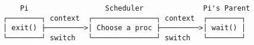 \documentclass[varwidth=50em,crop]{standalone}
\begin{document}
\begin{verbatim}
    Pi                  Scheduler              Pi's Parent
┌────────┐ context  ┌───────────────┐ context  ┌────────┐
│ exit() ├─────────>│ Choose a proc ├─────────>│ wait() │
└────────┘ switch   └───────────────┘ switch   └────────┘
\end{verbatim}
\end{document}
